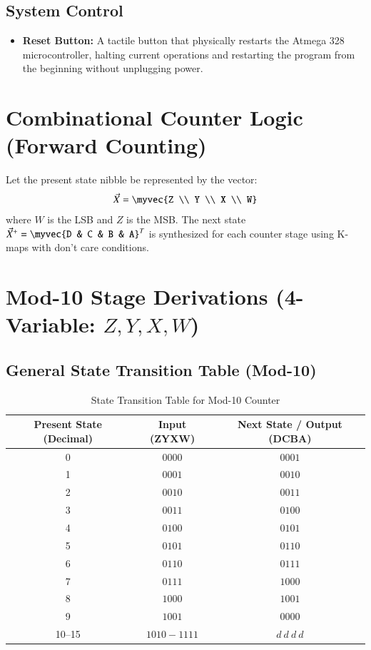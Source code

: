 \documentclass[journal,12pt,onecolumn]{IEEEtran}
\begin{document}
		\subsection{System Control}
		\begin{itemize}
			\item \textbf{Reset Button:} A tactile button that physically restarts the Atmega 328 microcontroller, halting current operations and restarting the program from the beginning without unplugging power.
		\end{itemize}
		
		\newpage
		
		\section{Combinational Counter Logic (Forward Counting)}
		
		Let the present state nibble be represented by the vector:
		\begin{align}
			\vec{X} = \myvec{Z \\ Y \\ X \\ W}
		\end{align}
		where $W$ is the LSB and $Z$ is the MSB. The next state $\vec{X}^+ = \myvec{D & C & B & A}^T$ is synthesized for each counter stage using K-maps with don't care conditions.
		
		\section{\textbf{Mod-10 Stage Derivations (4-Variable: $Z, Y, X, W$)}}
		\vspace{1em}
		\subsection{General State Transition Table (Mod-10)}
		
		\begin{table}[H]
			\centering
			\begin{tabular}{|c|c|c|}
				\hline
				\textbf{Present State (Decimal)} & \textbf{Input (ZYXW)} & \textbf{Next State / Output (DCBA)} \\
				\hline
				0 & $0000$ & $0001$ \\
				\hline
				1 & $0001$ & $0010$ \\
				\hline
				2 & $0010$ & $0011$ \\
				\hline
				3 & $0011$ & $0100$ \\
				\hline
				4 & $0100$ & $0101$ \\
				\hline
				5 & $0101$ & $0110$ \\
				\hline
				6 & $0110$ & $0111$ \\
				\hline
				7 & $0111$ & $1000$ \\
				\hline
				8 & $1000$ & $1001$ \\
				\hline
				9 & $1001$ & $0000$ \\
				\hline
				10--15 & $1010-1111$ & $d\ d\ d\ d$ \\
				\hline
			\end{tabular}
			\caption{State Transition Table for Mod-10 Counter}
		\end{table}
		
\end{document}
